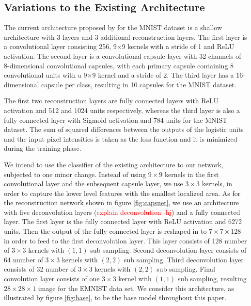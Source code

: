 \subsection{Variations to the Existing Architecture}
The current architecture proposed by \cite{sabour2017dynamic} for the MNIST dataset is a shallow architecture with 3 layers and 3 additional reconstruction layers. The first layer is a convolutional layer consisting 256, 9$\times$9 kernels with a stride of 1 and ReLU activation. The second layer is a convolutional capsule layer with 32 channels of 8-dimensional convolutional capsules, with each primary capsule containing 8 convolutional units with a 9$\times$9 kernel and a stride of 2. The third layer has a 16-dimensional capsule per class, resulting in 10 capsules for the MNIST dataset. 

The first two reconstruction layers are fully connected layers with ReLU activation and 512 and 1024 units respectively, whereas the third layer is also a fully connected layer with Sigmoid activation and 784 units for the MNIST dataset. The sum of squared differences between the outputs of the logistic units and the input pixel intensities is taken as the loss function and it is minimized during the training phase.

We intend to use the classifier of the existing architecture to our network, subjected to one minor change. Instead of using $9\times9$ kernels in the first convolutional layer and the subsequent capsule layer, we use $3\times3$ kernels, in order to capture the lower level features with the smallest localized area.
As for the reconstruction network shown in figure \ref{fig:capsnet}, we use an architecture with five deconvolution layers \cite{decon2010} (\textcolor{red}{explain deconvolution -hj}) and a fully connected layer. The first layer is the fully connected layer with ReLU activation and 6272 units. Then the output of the fully connected layer is reshaped in to $7\times7\times128$ in order to feed to the first deconvolution layer. This layer consists of 128 number of $3\times3$ kernels with $(1,1)$ sub sampling. Second deconvolution layer consists of 64 number of $3\times3$ kernels with $(2,2)$ sub sampling. Third deconvolution layer consists of 32 number of $3\times3$ kernels with $(2,2)$ sub sampling. Final convolution layer consists of one $3\times3$ kernel with $(1,1)$ sub sampling, resulting $28\times28\times1$ image for the EMNIST data set.
 We consider this architecture, as illustrated by figure \ref{fig:base}, to be the base model throughout this paper. 
 
